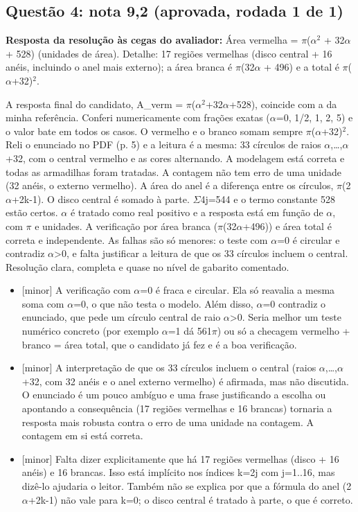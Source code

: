 \documentclass{article}%
\begin{document}
\subsection*{Questão 4: nota 9,2 (aprovada, rodada 1 de 1)}%
\textbf{Resposta da resolução às cegas do avaliador:} Área vermelha = $\pi$($\alpha$$^2$ + 32$\alpha$ + 528) (unidades de área). Detalhe: 17 regiões vermelhas (disco central + 16 anéis, incluindo o anel mais externo); a área branca é $\pi$(32$\alpha$ + 496) e a total é $\pi$($\alpha$+32)$^2$.\par %
A resposta final do candidato, A\_verm = $\pi$($\alpha$$^2$+32$\alpha$+528), coincide com a da minha referência. Conferi numericamente com frações exatas ($\alpha$=0, 1/2, 1, 2, 5) e o valor bate em todos os casos. O vermelho e o branco somam sempre $\pi$($\alpha$+32)$^2$. Reli o enunciado no PDF (p. 5) e a leitura é a mesma: 33 círculos de raios $\alpha$,\ldots{},$\alpha$+32, com o central vermelho e as cores alternando. A modelagem está correta e todas as armadilhas foram tratadas. A contagem não tem erro de uma unidade (32 anéis, o externo vermelho). A área do anel é a diferença entre os círculos, $\pi$(2$\alpha$+2k-1). O disco central é somado à parte. $\Sigma$4j=544 e o termo constante 528 estão certos. $\alpha$ é tratado como real positivo e a resposta está em função de $\alpha$, com $\pi$ e unidades. A verificação por área branca ($\pi$(32$\alpha$+496)) e área total é correta e independente. As falhas são só menores: o teste com $\alpha$=0 é circular e contradiz $\alpha$>0, e falta justificar a leitura de que os 33 círculos incluem o central. Resolução clara, completa e quase no nível de gabarito comentado.%
\begin{itemize}%
\item%
{[}minor{]} A verificação com $\alpha$=0 é fraca e circular. Ela só reavalia a mesma soma com $\alpha$=0, o que não testa o modelo. Além disso, $\alpha$=0 contradiz o enunciado, que pede um círculo central de raio $\alpha$>0. Seria melhor um teste numérico concreto (por exemplo $\alpha$=1 dá 561$\pi$) ou só a checagem vermelho + branco = área total, que o candidato já fez e é a boa verificação.%
\item%
{[}minor{]} A interpretação de que os 33 círculos incluem o central (raios $\alpha$,\ldots{},$\alpha$+32, com 32 anéis e o anel externo vermelho) é afirmada, mas não discutida. O enunciado é um pouco ambíguo e uma frase justificando a escolha ou apontando a consequência (17 regiões vermelhas e 16 brancas) tornaria a resposta mais robusta contra o erro de uma unidade na contagem. A contagem em si está correta.%
\item%
{[}minor{]} Falta dizer explicitamente que há 17 regiões vermelhas (disco + 16 anéis) e 16 brancas. Isso está implícito nos índices k=2j com j=1..16, mas dizê{-}lo ajudaria o leitor. Também não se explica por que a fórmula do anel (2$\alpha$+2k-1) não vale para k=0; o disco central é tratado à parte, o que é correto.%
\end{itemize}%
\end{document}
